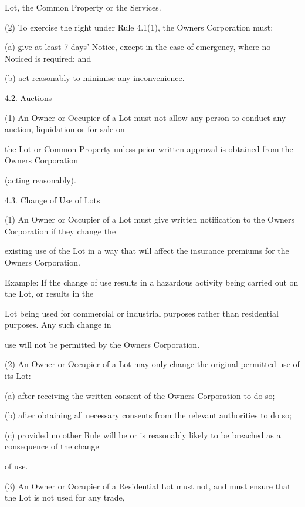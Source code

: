 \documentclass{article}
\begin{document}
{\fontsize{10.02}{1}Lot, the Common Property or the Services. }

{\fontsize{9.962}{1}(2) To exercise the right under Rule 4.1(1), the Owners Corporation must: }


{\fontsize{9.962}{1}(a) give at least 7 days’ Notice, except in the case of emergency, where no Noticed is required; and }

{\fontsize{9.962}{1}(b) act reasonably to minimise any inconvenience. }

{\fontsize{9.99}{1}4.2. Auctions }

{\fontsize{9.962}{1}(1) An Owner or Occupier of a Lot must not allow any person to conduct any auction, liquidation or for sale on }

{\fontsize{10.02}{1}the Lot or Common Property unless prior written approval is obtained from the Owners Corporation }

{\fontsize{10.02}{1}(acting reasonably). }

{\fontsize{9.99}{1}4.3. Change of Use of Lots }

{\fontsize{9.962}{1}(1) An Owner or Occupier of a Lot must give written notification to the Owners Corporation if they change the }

{\fontsize{10.02}{1}existing use of the Lot in a way that will affect the insurance premiums for the Owners Corporation. }

{\fontsize{10.02}{1}Example: If the change of use results in a hazardous activity being carried out on the Lot, or results in the }

{\fontsize{10.02}{1}Lot being used for commercial or industrial purposes rather than residential purposes. Any such change in }

{\fontsize{10.02}{1}use will not be permitted by the Owners Corporation. }

{\fontsize{9.962}{1}(2) An Owner or Occupier of a Lot may only change the original permitted use of its Lot: }

{\fontsize{9.962}{1}(a) after receiving the written consent of the Owners Corporation to do so; }

{\fontsize{9.962}{1}(b) after obtaining all necessary consents from the relevant authorities to do so; }

{\fontsize{9.962}{1}(c) provided no other Rule will be or is reasonably likely to be breached as a consequence of the change }

{\fontsize{10.02}{1}of use. }

{\fontsize{9.962}{1}(3) An Owner or Occupier of a Residential Lot must not, and must ensure that the Lot is not used for any trade, }
\end{document}
